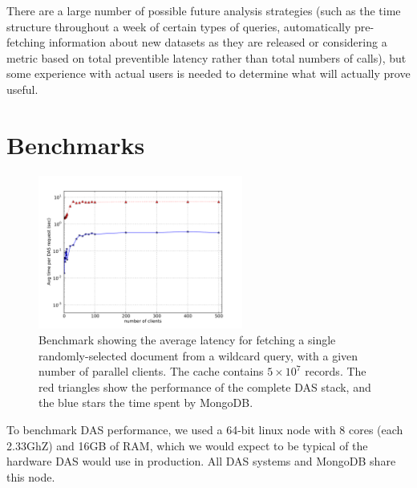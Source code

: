 \documentclass[a4paper]{jpconf}
\begin{document}
There are a large number of possible future analysis strategies (such as the time structure throughout a week of certain types of queries, automatically pre-fetching information about new datasets as they are released or considering a metric based on total preventible latency rather than total numbers of calls), but some experience with actual users is needed to determine what will actually prove useful.

\section{\label{benchmarks}Benchmarks}

\begin{figure}
\begin{center}
\includegraphics[width=0.6\textwidth]{das_vs_mongo_fully_random}
\end{center}
\caption{\label{dasbench}Benchmark showing the average latency for fetching a single randomly-selected document from a wildcard query, with a given number of parallel clients. The cache contains $5\times10^7$ records. The red triangles show the performance of the complete DAS stack, and the blue stars the time spent by MongoDB.}
\end{figure}

To benchmark DAS performance, we used a 64-bit linux node with 8 cores (each 2.33GhZ) and 16GB of RAM, which we would expect to be typical of the hardware DAS would use in production. All DAS systems and MongoDB share this node.
\end{document}
